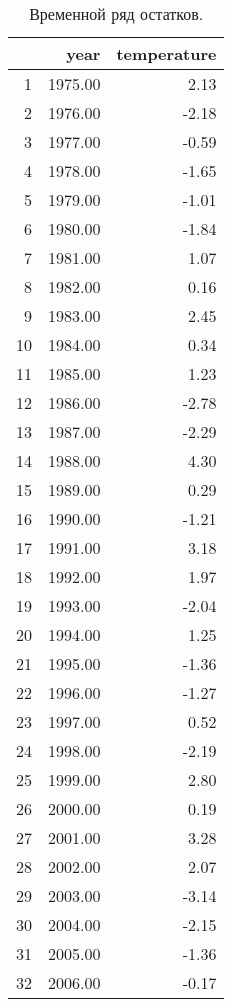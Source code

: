 \begin{table}[H]
\centering
\begin{tabular}{rrr}
  \hline
 & year & temperature \\ 
  \hline
1 & 1975.00 & 2.13 \\ 
  2 & 1976.00 & -2.18 \\ 
  3 & 1977.00 & -0.59 \\ 
  4 & 1978.00 & -1.65 \\ 
  5 & 1979.00 & -1.01 \\ 
  6 & 1980.00 & -1.84 \\ 
  7 & 1981.00 & 1.07 \\ 
  8 & 1982.00 & 0.16 \\ 
  9 & 1983.00 & 2.45 \\ 
  10 & 1984.00 & 0.34 \\ 
  11 & 1985.00 & 1.23 \\ 
  12 & 1986.00 & -2.78 \\ 
  13 & 1987.00 & -2.29 \\ 
  14 & 1988.00 & 4.30 \\ 
  15 & 1989.00 & 0.29 \\ 
  16 & 1990.00 & -1.21 \\ 
  17 & 1991.00 & 3.18 \\ 
  18 & 1992.00 & 1.97 \\ 
  19 & 1993.00 & -2.04 \\ 
  20 & 1994.00 & 1.25 \\ 
  21 & 1995.00 & -1.36 \\ 
  22 & 1996.00 & -1.27 \\ 
  23 & 1997.00 & 0.52 \\ 
  24 & 1998.00 & -2.19 \\ 
  25 & 1999.00 & 2.80 \\ 
  26 & 2000.00 & 0.19 \\ 
  27 & 2001.00 & 3.28 \\ 
  28 & 2002.00 & 2.07 \\ 
  29 & 2003.00 & -3.14 \\ 
  30 & 2004.00 & -2.15 \\ 
  31 & 2005.00 & -1.36 \\ 
  32 & 2006.00 & -0.17 \\ 
   \hline
\end{tabular}
\caption{Временной ряд остатков.} 
\label{table:residuals}
\end{table}
